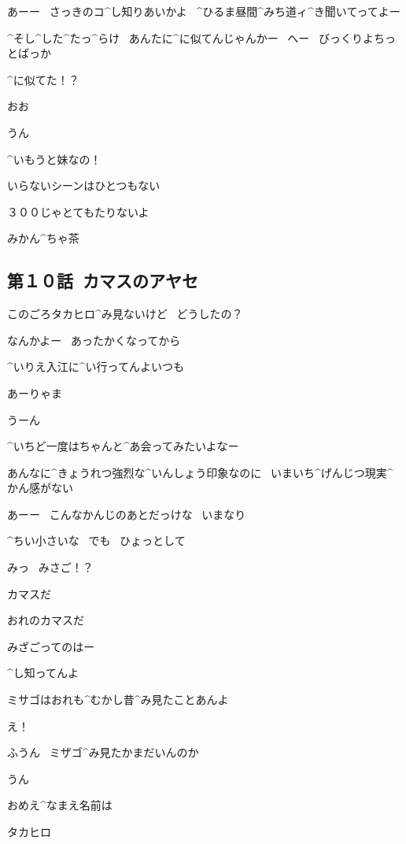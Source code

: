 \Ojisan あーー
\ さっきのコ^{し}{知}りあいかよ
\ ^{ひるま}{昼間}^{みち}{道}ィ^{き}{聞}いてってよー

\Ojisan ^{そ}{し}^{し}{た}^{た}{っ}^{ら}{け}
\ あんたに^{に}{似}てんじゃんかー
\ へー
\ びっくりよちっとばっか

\Alpha ^{に}{似}てた！？

\Ojisan おお

\page
\Alpha うん

\Alpha ^{いもうと}{妹}なの！

\Alpha いらないシーンはひとつもない

\Alpha ３００じゃとてもたりないよ

\Sign みかん^{ちゃ}{茶}


\subsection{第１０話\ カマスのアヤセ}

\page[36]
\Alpha このごろタカヒロ^{み}{見}ないけど
\ どうしたの？

\Ojisan なんかよー
\ あったかくなってから

\Ojisan ^{いりえ}{入江}に^{い}{行}ってんよいつも

\Alpha あーりゃま

\page
\Takahiro うーん

\Takahiro ^{いちど}{一度}はちゃんと^{あ}{会}ってみたいよなー

\page
\Takahiro あんなに^{きょうれつ}{強烈}な^{いんしょう}{印象}なのに
\ いまいち^{げんじつ}{現実}^{かん}{感}がない

\Takahiro あーー
\ こんなかんじのあとだっけな
\ いまなり

\page
\Takahiro ^{ちい}{小}さいな
\ でも
\ ひょっとして

\Takahiro みっ
\ みさご！？

\page
\Ayase カマスだ

\Ayase おれのカマスだ

\Takahiro みざごってのはー

\Ayase ^{し}{知}ってんよ

\Ayase ミサゴはおれも^{むかし}{昔}^{み}{見}たことあんよ

\Takahiro え！

\page
\Ayase ふうん
\ ミザゴ^{み}{見}たかまだいんのか

\Takahiro うん

\Ayase おめえ^{なまえ}{名前}は

\Takahiro タカヒロ

